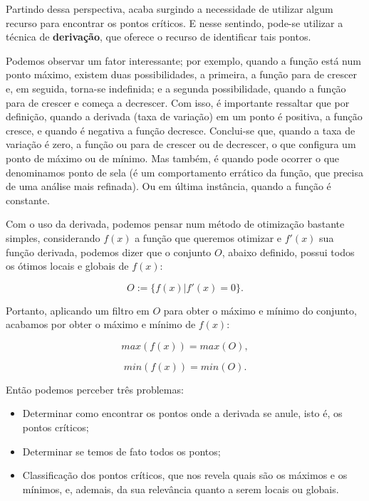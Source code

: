 Partindo dessa perspectiva, acaba surgindo a necessidade de utilizar algum
recurso para encontrar os pontos críticos. E nesse sentindo, pode-se utilizar
a técnica de \textbf{derivação}, que oferece o recurso de identificar tais
pontos.


Podemos observar um fator interessante; por exemplo,
quando a função está num ponto máximo, existem duas possibilidades, a primeira,
a função para de crescer e, em seguida, torna-se indefinida; e a
segunda possibilidade, quando a função para de crescer e começa a decrescer.
Com isso, é importante ressaltar que por definição, quando a derivada (taxa de
variação) em um ponto é positiva, a função cresce, e quando é negativa a função
decresce. Conclui-se que, quando a taxa de variação é zero, a função ou para de
crescer ou de decrescer, o que configura um ponto de máximo ou de mínimo. Mas
também, é quando pode ocorrer o que denominamos ponto de sela (é um
comportamento errático da função, que precisa de uma análise mais refinada). Ou
em última instância, quando a função é constante.

Com o uso da derivada, podemos pensar num método de otimização bastante simples,
considerando \(f(x)\) a função que queremos otimizar e \(f'(x)\) sua função
derivada, podemos dizer que o conjunto $O$, abaixo definido, possui todos os
ótimos locais e globais de \(f(x)\):

\begin{equation}
    O := \{f(x) | f'(x) = 0\}.
    \label{equacao_conjunto_o}
\end{equation}


Portanto, aplicando um filtro em $O$ para obter o máximo e mínimo do conjunto,
acabamos por obter o máximo e mínimo de \(f(x)\):


\begin{equation}
    max(f(x)) = max(O),
\end{equation}

\begin{equation}
    min(f(x)) = min(O).
\end{equation}


Então podemos perceber três problemas:

\begin{itemize}
  \item Determinar como encontrar os pontos onde a derivada se anule, isto é,
    os pontos críticos;
  \item Determinar se temos de fato todos os pontos;
  \item Classificação dos pontos críticos, que nos revela quais são os máximos e
  os mínimos, e, ademais, da sua relevância quanto a serem locais ou globais.
\end{itemize}


